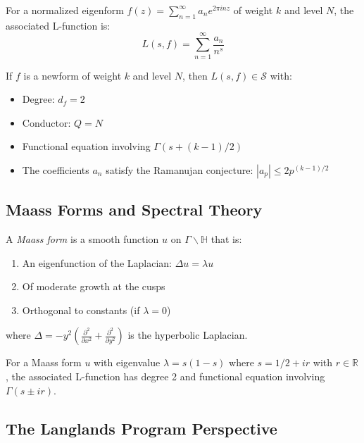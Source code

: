 \begin{definition}
For a normalized eigenform $f(z) = \sum_{n=1}^{\infty} a_n e^{2\pi i nz}$ of weight $k$ and level $N$, the associated L-function is:
\begin{equation}
L(s,f) = \sum_{n=1}^{\infty} \frac{a_n}{n^s}
\end{equation}
\end{definition}

\begin{theorem}
If $f$ is a newform of weight $k$ and level $N$, then $L(s,f) \in \mathcal{S}$ with:
\begin{itemize}
\item Degree: $d_f = 2$
\item Conductor: $Q = N$
\item Functional equation involving $\Gamma(s + (k-1)/2)$
\item The coefficients $a_n$ satisfy the Ramanujan conjecture: $|a_p| \leq 2p^{(k-1)/2}$
\end{itemize}
\end{theorem}

\subsection{Maass Forms and Spectral Theory}

\begin{definition}
A \emph{Maass form} is a smooth function $u$ on $\Gamma\backslash\mathbb{H}$ that is:
\begin{enumerate}
\item An eigenfunction of the Laplacian: $\Delta u = \lambda u$
\item Of moderate growth at the cusps
\item Orthogonal to constants (if $\lambda = 0$)
\end{enumerate}
where $\Delta = -y^2\left(\frac{\partial^2}{\partial x^2} + \frac{\partial^2}{\partial y^2}\right)$ is the hyperbolic Laplacian.
\end{definition}

For a Maass form $u$ with eigenvalue $\lambda = s(1-s)$ where $s = 1/2 + ir$ with $r \in \mathbb{R}$, the associated L-function has degree 2 and functional equation involving $\Gamma(s \pm ir)$.

\subsection{The Langlands Program Perspective}

